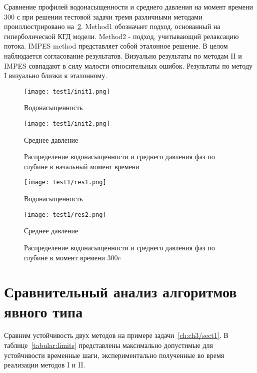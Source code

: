 Сравнение профилей водонасыщенности и среднего давления на момент времени 300 с при решении
тестовой задачи тремя различными методами проиллюстрировано на~\ref{t1_pic2}.
Method1 обозначает подход, основанный на гиперболической КГД
модели. Method2 - подход, учитывающий релаксацию потока. IMPES method представляет собой эталонное решение. В целом наблюдается согласование результатов.
Визуально результаты по методам II и IMPES совпадают в силу малости относительных ошибок. Результаты по методу I визуально близки к эталонному.

\begin{figure}
\centering
    \begin{minipage}[h]{0.49\textwidth}
       \texttt{[image: test1/init1.png]}
       \caption*{Водонасыщенность}
    \end{minipage}
    \hfill
    \begin{minipage}[h]{0.49\textwidth}
       \texttt{[image: test1/init2.png]}
       \caption*{Среднее давление}
    \end{minipage}
  \caption{Распределение водонасыщенности и среднего давления фаз по глубине в начальный момент времени}
  \label{t1_pic1}
\end{figure}

\begin{figure}
\centering
    \begin{minipage}[h]{0.49\textwidth}
       \texttt{[image: test1/res1.png]}
       \caption*{Водонасыщенность}
    \end{minipage}
    \hfill
    \begin{minipage}[h]{0.49\textwidth}
       \texttt{[image: test1/res2.png]}
       \caption*{Среднее давление}
    \end{minipage}
  \caption{Распределение водонасыщенности и среднего давления фаз по глубине в момент времени 300c}
  \label{t1_pic2}
\end{figure}

\section{Сравнительный анализ алгоритмов явного типа} \label{ch:ch3/sect2}

Сравним устойчивость двух методов на примере задачи~\ref{ch:ch3/sect1}.
В таблице~\ref{tabular:limits} представлены максимально допустимые для устойчивости временные шаги, экспериментально полученные во время реализации методов I и II. 

